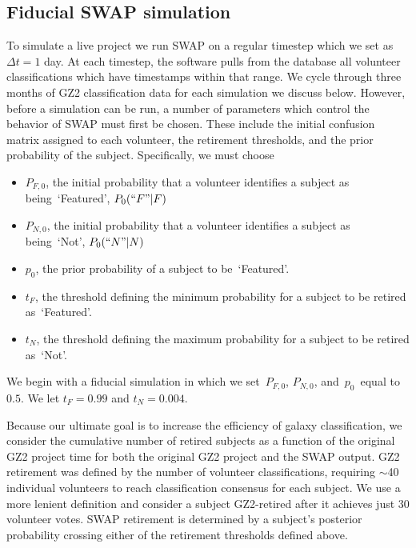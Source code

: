 \documentclass[twocolumn]{aastex6}
\newcommand{\Pf}{$P_{F,0}$}
\newcommand{\Pn}{$P_{N,0}$}
\newcommand{\p}{$p_0$}
\newcommand{\tf}{$t_F$}
\newcommand{\tn}{$t_N$}
\newcommand{\feat}{`Featured'}
\newcommand{\notfeat}{`Not'}
\begin{document}
\subsection{Fiducial SWAP simulation}\label{sec: fiducial}

To simulate a live project we run SWAP on a regular timestep which we set as $\Delta t = 1$ day. 
At each timestep, the software pulls from the database all volunteer classifications which
have timestamps within that range. We cycle through three months of GZ2 classification data 
for each simulation we discuss below. However, before a simulation can be run, a number 
of parameters which control the behavior of SWAP must first be chosen. These include
 the initial confusion matrix assigned to each volunteer, the retirement
thresholds, and the prior probability of the subject. Specifically, we must choose 
\begin{itemize}
\item \Pf, the initial probability that a volunteer identifies a subject as being~\feat, $P_0(``F"|F)$
\item \Pn, the initial probability that a volunteer identifies a subject as being~\notfeat, $P_0(``N"|N)$
\item \p, the prior probability of a subject to be~\feat.
\item \tf, the threshold defining the minimum probability for a subject to be retired as~\feat.
\item \tn, the threshold defining the maximum probability for a subject to be retired as~\notfeat.
\end{itemize}


We begin with a fiducial simulation in which we set~\Pf, \Pn, and~\p~equal to $0.5$.
We let $t_F = 0.99$ and $t_N = 0.004$. 

Because our ultimate goal is to increase the efficiency of galaxy classification,
we consider the cumulative number of retired subjects
as a function of the original GZ2 project time for both the original GZ2 project
and the SWAP output. 
GZ2 retirement was defined by the number of volunteer classifications, requiring
$\sim$40 individual volunteers to reach classification consensus for each subject. 
We use a more lenient definition and consider a subject GZ2-retired after it achieves 
just 30 volunteer votes. SWAP retirement is determined by a subject's posterior 
probability crossing either of the retirement thresholds defined above. 
\end{document}
